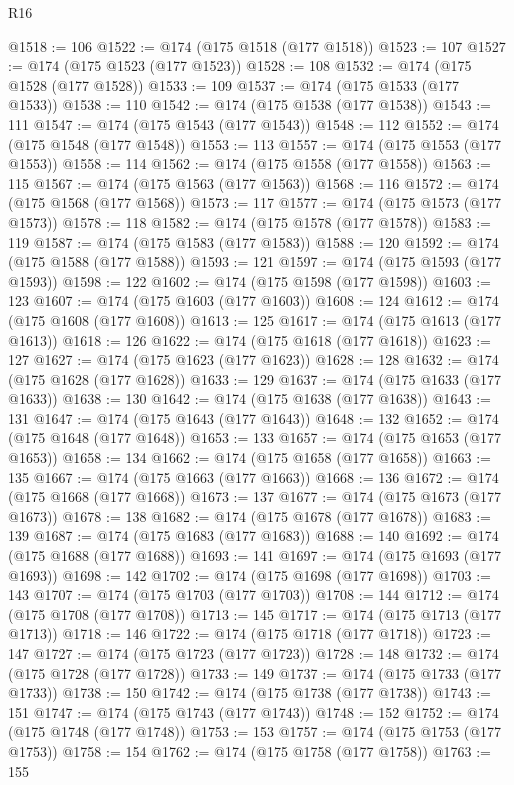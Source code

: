 \begin{lexlean}{R16}
\begin{coremodule}
@1518 := 106
@1522 := @174 (@175 @1518 (@177 @1518))
@1523 := 107
@1527 := @174 (@175 @1523 (@177 @1523))
@1528 := 108
@1532 := @174 (@175 @1528 (@177 @1528))
@1533 := 109
@1537 := @174 (@175 @1533 (@177 @1533))
@1538 := 110
@1542 := @174 (@175 @1538 (@177 @1538))
@1543 := 111
@1547 := @174 (@175 @1543 (@177 @1543))
@1548 := 112
@1552 := @174 (@175 @1548 (@177 @1548))
@1553 := 113
@1557 := @174 (@175 @1553 (@177 @1553))
@1558 := 114
@1562 := @174 (@175 @1558 (@177 @1558))
@1563 := 115
@1567 := @174 (@175 @1563 (@177 @1563))
@1568 := 116
@1572 := @174 (@175 @1568 (@177 @1568))
@1573 := 117
@1577 := @174 (@175 @1573 (@177 @1573))
@1578 := 118
@1582 := @174 (@175 @1578 (@177 @1578))
@1583 := 119
@1587 := @174 (@175 @1583 (@177 @1583))
@1588 := 120
@1592 := @174 (@175 @1588 (@177 @1588))
@1593 := 121
@1597 := @174 (@175 @1593 (@177 @1593))
@1598 := 122
@1602 := @174 (@175 @1598 (@177 @1598))
@1603 := 123
@1607 := @174 (@175 @1603 (@177 @1603))
@1608 := 124
@1612 := @174 (@175 @1608 (@177 @1608))
@1613 := 125
@1617 := @174 (@175 @1613 (@177 @1613))
@1618 := 126
@1622 := @174 (@175 @1618 (@177 @1618))
@1623 := 127
@1627 := @174 (@175 @1623 (@177 @1623))
@1628 := 128
@1632 := @174 (@175 @1628 (@177 @1628))
@1633 := 129
@1637 := @174 (@175 @1633 (@177 @1633))
@1638 := 130
@1642 := @174 (@175 @1638 (@177 @1638))
@1643 := 131
@1647 := @174 (@175 @1643 (@177 @1643))
@1648 := 132
@1652 := @174 (@175 @1648 (@177 @1648))
@1653 := 133
@1657 := @174 (@175 @1653 (@177 @1653))
@1658 := 134
@1662 := @174 (@175 @1658 (@177 @1658))
@1663 := 135
@1667 := @174 (@175 @1663 (@177 @1663))
@1668 := 136
@1672 := @174 (@175 @1668 (@177 @1668))
@1673 := 137
@1677 := @174 (@175 @1673 (@177 @1673))
@1678 := 138
@1682 := @174 (@175 @1678 (@177 @1678))
@1683 := 139
@1687 := @174 (@175 @1683 (@177 @1683))
@1688 := 140
@1692 := @174 (@175 @1688 (@177 @1688))
@1693 := 141
@1697 := @174 (@175 @1693 (@177 @1693))
@1698 := 142
@1702 := @174 (@175 @1698 (@177 @1698))
@1703 := 143
@1707 := @174 (@175 @1703 (@177 @1703))
@1708 := 144
@1712 := @174 (@175 @1708 (@177 @1708))
@1713 := 145
@1717 := @174 (@175 @1713 (@177 @1713))
@1718 := 146
@1722 := @174 (@175 @1718 (@177 @1718))
@1723 := 147
@1727 := @174 (@175 @1723 (@177 @1723))
@1728 := 148
@1732 := @174 (@175 @1728 (@177 @1728))
@1733 := 149
@1737 := @174 (@175 @1733 (@177 @1733))
@1738 := 150
@1742 := @174 (@175 @1738 (@177 @1738))
@1743 := 151
@1747 := @174 (@175 @1743 (@177 @1743))
@1748 := 152
@1752 := @174 (@175 @1748 (@177 @1748))
@1753 := 153
@1757 := @174 (@175 @1753 (@177 @1753))
@1758 := 154
@1762 := @174 (@175 @1758 (@177 @1758))
@1763 := 155

\end{coremodule}
\end{lexlean}
